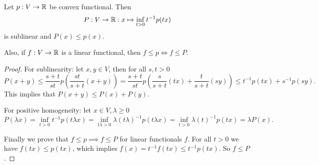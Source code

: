 \begin{lemma}
Let $p: V\to\mathbb{R}$ be convex functional. Then
\[ P: V\to\mathbb{R}: x\mapsto \inf_{t>0} t^{-1}p(tx) \]
is sublinear and $P(x)\leq p(x)$.

Also, if $f:V\to \mathbb{R}$ is a linear functional, then $f\leq p \iff f\leq P$.
\end{lemma}
\begin{proof}
For sublinearity: let $x,y\in V$, then for all $s,t>0$
\[ P(x+y) \leq \frac{s+t}{st}p\left(\frac{st}{s+t}(x+y)\right) = \frac{s+t}{st}p\left(\frac{s}{s+t}(tx)+\frac{t}{s+t}(sy)\right) \leq t^{-1}p(tx) + s^{-1}p(sy). \]
This implies that $P(x+y)\leq P(x)+P(y)$.

For positive homogeneity: let $x\in V,\lambda\geq 0$
\[ P(\lambda x) = \inf_{t>0} t^{-1}p(t\lambda x) = \inf_{t\lambda>0} \lambda (t\lambda)^{-1}p(t\lambda x) = \inf_{t>0} \lambda (t)^{-1}p(tx) = \lambda P(x). \]

Finally we prove that $f\leq p \implies f\leq P$ for linear functionals $f$. For all $t>0$ we have $f(tx) \leq p(tx)$, which implies $f(x) = t^{-1}f(tx) \leq t^{-1}p(tx)$. So $f\leq P$.
\end{proof}

